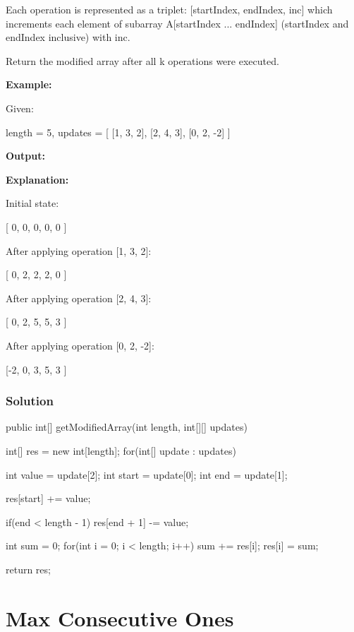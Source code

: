 Each operation is represented as a triplet: [startIndex, endIndex, inc] which increments each element of subarray A[startIndex ... endIndex] (startIndex and endIndex inclusive) with inc.

Return the modified array after all k operations were executed.

\textbf{Example:}

Given:
\begin{Code}
    length = 5,
    updates = [
        [1,  3,  2],
        [2,  4,  3],
        [0,  2, -2]
    ]
\end{Code}

\textbf{Output:}

\begin{Code}
    [-2, 0, 3, 5, 3]
\end{Code}

\textbf{Explanation:}

Initial state:

[ 0, 0, 0, 0, 0 ]

After applying operation [1, 3, 2]:

[ 0, 2, 2, 2, 0 ]

After applying operation [2, 4, 3]:

[ 0, 2, 5, 5, 3 ]

After applying operation [0, 2, -2]:

[-2, 0, 3, 5, 3 ]

\newpage

\subsubsection{Solution}

\begin{Code}
public int[] getModifiedArray(int length, int[][] updates) {
    int[] res = new int[length];
    for(int[] update : updates) {
        int value = update[2];
        int start = update[0];
        int end = update[1];

        res[start] += value;

        if(end < length - 1)
            res[end + 1] -= value;

    }

    int sum = 0;
    for(int i = 0; i < length; i++) {
        sum += res[i];
        res[i] = sum;
    }

    return res;
}
\end{Code}

\newpage

\section{Max Consecutive Ones} %

